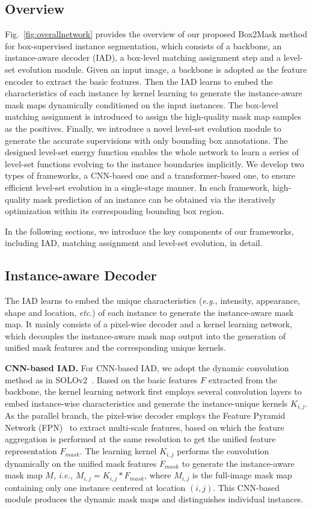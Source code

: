 \documentclass[12pt,onecolumn,letterpaper]{article}
\begin{document}
\subsection{Overview}
Fig.~\ref{fig:overallnetwork} provides the overview of our proposed Box2Mask method for box-supervised instance segmentation, which consists of a backbone, an instance-aware decoder (IAD), a box-level matching assignment step and a level-set evolution module.
Given an input image, a backbone is adopted as the feature encoder to extract the basic features.
Then the IAD learns to embed the characteristics of each instance by kernel learning to generate the instance-aware mask maps dynamically conditioned on the input instances. 
The box-level matching assignment is introduced to assign the high-quality mask map samples as the positives. Finally, we introduce a novel level-set evolution module to generate the accurate supervisions  with only bounding box annotations.
The designed level-set energy function enables the whole network to learn a series of level-set functions evolving to the instance boundaries implicitly.
We develop two types of frameworks, a CNN-based one and a transformer-based one, to ensure efficient level-set evolution in a single-stage manner. In each framework, high-quality mask prediction of an instance can be obtained via the iteratively optimization within its corresponding bounding box region.

In the following sections, we introduce the key components of our frameworks, including IAD, matching assignment and level-set evolution, in detail. 


\subsection{Instance-aware Decoder}

The IAD learns to embed the unique characteristics (\textit{e.g.}, intensity, appearance, shape and location, \textit{etc}.) of each instance to generate the instance-aware mask map.  It mainly consists of a pixel-wise decoder and a kernel learning network, which decouples the instance-aware mask map output into the generation of unified mask features and the corresponding unique kernels.

\textbf{CNN-based IAD.}
For CNN-based IAD, we adopt the dynamic convolution method as in SOLOv2~\cite{wang2020solov2, PMAI2021solo}.
Based on the basic features $F$ extracted from the backbone, the  kernel learning network first employs several convolution layers to embed instance-wise characteristics and generate the instance-unique kernels $K_{i,j}$.
As the parallel branch, the pixel-wise decoder employs the Feature Pyramid Network (FPN)~\cite{cvpr2017_FPN} to extract multi-scale features, based on which the feature aggregation is performed at the same resolution to get the unified feature representation $F_{mask}$.
The learning kernel $K_{i,j}$ performs the convolution dynamically on the unified mask features $F_{mask}$ to generate the instance-aware mask map $M$, \textit{i.e.,} $M_{i,j} = K_{i,j} * F_{mask}$, where ${M_{i,j}}$ is the full-image mask map containing only one instance centered at location $(i,j)$. This CNN-based module produces the dynamic mask maps and distinguishes individual instances.
\end{document}
